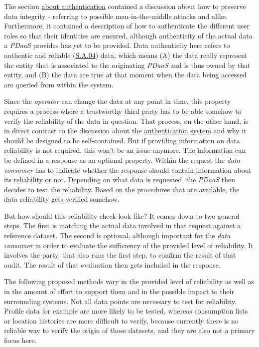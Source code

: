 \documentclass[12pt,english,a4paper,titlepage,cleardoublepage=empty,dottedtoc]{report}
\begin{document}
The section \protect\hyperlink{authentication}{about authentication}
contained a discussion about how to preserve data integrity - referring
to possible man-in-the-middle attacks and alike. Furthermore, it
contained a description of how to authenticate the different user roles
so that their identities are ensured, although authenticity of the
actual data a \emph{PDaaS} provides has yet to be provided. Data
authenticity here refers to authentic and reliable
(\protect\hyperlink{sa04}{S.A.04}) data, which means (A) the data really
represent the entity that is associated to the originating \emph{PDaaS}
and is thus owned by that entity, and (B) the data are true at that
moment when the data being accessed are queried from within the system.

Since the \emph{operator} can change the data at any point in time, this
property requires a process where a trustworthy third party has to be
able somehow to verify the reliability of the data in question. That
process, on the other hand, is in direct contrast to the discussion
about the \protect\hyperlink{authentication}{authentication system} and
why it should be designed to be self-contained. But if providing
information on data reliability is not required, this won't be an issue
anymore. The information can be defined in a response as an optional
property. Within the request the \emph{data consumer} has to indicate
whether the response should contain information about its reliability or
not. Depending on what data is requested, the \emph{PDaaS} then decides
to test the reliability. Based on the procedures that are available, the
data reliability gets verified somehow.

But how should this reliability check look like? It comes down to two
general steps. The first is matching the actual data involved in that
request against a reference dataset. The second is optional, although
important for the \emph{data consumer} in order to evaluate the
sufficiency of the provided level of reliability. It involves the party,
that also runs the first step, to confirm the result of that audit. The
result of that evaluation then gets included in the response.

The following proposed methods vary in the provided level of reliability
as well as in the amount of effort to support them and in the possible
impact to their surrounding systems. Not all data points are necessary
to test for reliability. Profile data for example are more likely to be
tested, whereas consumption lists or location histories are more
difficult to verify, because currently there is no reliable way to
verify the origin of those datasets, and they are also not a primary
focus here.
\end{document}

